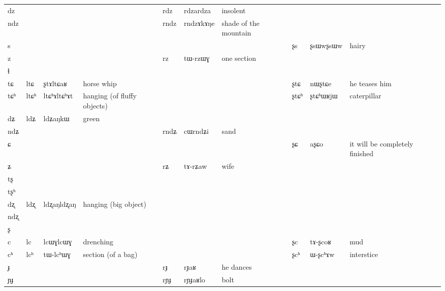 \documentclass[oldfontcommands,oneside,a4paper,11pt]{article}
\newcommand{\ipa}[1]{{\phon #1}} %
\newcommand{\tib}[1]{\cellcolor{lightgray}\textbf{#1}}
\newcommand{\idph}[1]{\cellcolor{gray}\textbf{#1}}
\begin{document}
\begin{table}
{\begin{tabular}{l|lll|lll|lll|l}
\ipa{dz}  & 	  & 	  & 	  & 	 \ipa{rdz} \idph{}  & 	 \ipa{rdzardza}  & 	 insolent & 	 & 	 & 	 & 	\\
\ipa{ndz}  & 	  & 	  & 	  & 	 \ipa{rndz}  & 	 \ipa{rndzɤkɤŋe}  & 	 shade of the mountain & 	 & 	 & 	 & 	\\
\ipa{s}  & 	  & 	  & 	  & 	 & 	 & 	 & 	 \ipa{ʂs} \idph{}  & 	 \ipa{ʂsɯwʂsɯw}  & 	 hairy & 	\\
\ipa{z}  & 	  & 	  & 	  & 	 \ipa{rz}  & 	 \ipa{tɯ-rzɯɣ}  & 	 one section & 	 & 	 & 	 & 	\\
\ipa{ɬ}  & 	  & 	  & 	  & 	  & 	  & 	  & 	 & 	 & 	 & 	\\
\ipa{tɕ}  & 	 \ipa{ltɕ}  & 	 \ipa{ʂtɤltɕaʁ}  & 	 horse whip  & 	 & 	 & 	 & 	 \ipa{ʂtɕ}  & 	 \ipa{nɯʂtɕe}  & 	he teases him  & 	\\
\ipa{tɕʰ}  & 	 \ipa{ltɕʰ} \idph{}  & 	 \ipa{ltɕʰɤltɕʰɤt}  & 	hanging (of fluffy objects)  & 	 & 	 & 	 & 	 \ipa{ʂtɕʰ}  & 	 \ipa{ʂtɕʰɯʁjɯ}  & 	caterpillar  & 	\\
\ipa{dʑ}  & 	 \ipa{ldʑ} \tib{}  & 	 \ipa{ldʑaŋkɯ}  & 	 green & 	  & 	  & 	  & 	 & 	 & 	 & 	\\
\ipa{ndʑ}  & 	  & 	  & 	  & 	 \ipa{rndʑ}  & 	 \ipa{cɯrndʑi}  & 	sand  & 	 & 	 & 	 & 	\\
\ipa{ɕ}  & 	  & 	  & 	  & 	 & 	 & 	 & 	 \ipa{ʂɕ}  & 	 \ipa{aʂɕo}  & 	 it will be completely finished  & 	\\
\ipa{ʑ}  & 	  & 	  & 	  & 	 \ipa{rʑ}  & 	 \ipa{tɤ-rʑaw}  & 	wife  & 	 & 	 & 	 & 	\\
\ipa{tʂ}  & 	  & 	  & 	  & 	  & 	  & 	  & 	 & 	 & 	 & 	\\
\ipa{tʂʰ}  & 	  & 	  & 	  & 	  & 	  & 	  & 	 & 	 & 	 & 	\\
\ipa{dʐ}  & 	 \ipa{ldʐ} \idph{}  & 	 \ipa{ldʐaŋldʐaŋ}  & 	 hanging (big object) & 	  & 	  & 	  & 	 & 	 & 	 & 	\\
\ipa{ndʐ}  & 	  & 	  & 	  & 	  & 	  & 	  & 	 & 	 & 	 & 	\\
\ipa{ʂ}  & 	  & 	  & 	  & 	  & 	  & 	  & 	 & 	 & 	 & 	\\
\ipa{c}  & 	 \ipa{lc} \idph{} & 	 \ipa{lcɯɣlcɯɣ}  & 	 drenching & 	 & 	 & 	 & 	 \ipa{ʂc}  & 	 \ipa{tɤ-ʂcoʁ}  & 	 mud & 	\\
\ipa{cʰ}  & 	 \ipa{lcʰ}  & 	 \ipa{tɯ-lcʰɯɣ}  & 	 section (of a bag) & 	 & 	 & 	 & 	 \ipa{ʂcʰ}  & 	 \ipa{ɯ-ʂcʰɤw}  & 	 interstice & 	\\
\ipa{ɟ}  & 	  & 	  & 	  & 	 \ipa{rɟ}  & 	 \ipa{rɟaʁ}  & 	he dances  & 	 & 	 & 	 & 	\\
\ipa{ɲɟ}  & 	  & 	  & 	  & 	 \ipa{rɲɟ}  & 	 \ipa{rɲɟaʁlo}  & 	 bolt & 	 & 	 & 	 & 	\\

\end{tabular}}
\end{table}
\end{document}
